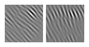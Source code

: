 \begin{figure}[ht]
\begin{center}
  \includegraphics[width=\columnwidth/9]{ch4/figures/real_1_6.jpg}
  \includegraphics[width=\columnwidth/9]{ch4/figures/real_1_7.jpg}\\

\end{center}
\end{figure}
